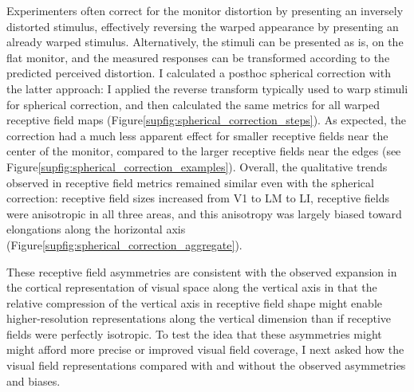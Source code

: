 Experimenters often correct for the monitor distortion by presenting an inversely distorted stimulus, effectively reversing the warped appearance by presenting an already warped stimulus\cite{Labrigger2012}. Alternatively, the stimuli can be presented as is, on the flat monitor, and the measured responses can be transformed according to the predicted perceived distortion. I calculated a posthoc spherical correction with the latter approach:  I applied the reverse transform typically used to warp stimuli for spherical correction, and then calculated the same metrics for all warped receptive field maps (Figure\ref{supfig:spherical_correction_steps}). As expected, the correction had a much less apparent effect for smaller receptive fields near the center of the monitor, compared to the larger receptive fields near the edges (see Figure\ref{supfig:spherical_correction_examples}). Overall, the qualitative trends observed in receptive field metrics remained similar even with the spherical correction: receptive field sizes increased from V1 to LM to LI, receptive fields were anisotropic in all three areas, and this anisotropy was largely biased toward elongations along the horizontal axis (Figure\ref{supfig:spherical_correction_aggregate}).

These receptive field asymmetries are consistent with the observed expansion in the cortical representation of visual space along the vertical axis in that the relative compression of the vertical axis in receptive field shape might enable higher-resolution representations along the vertical dimension than if receptive fields were perfectly isotropic. To test the idea that these asymmetries might might afford more precise or improved visual field coverage, I next asked how the visual field representations compared with and without the observed asymmetries and biases.

